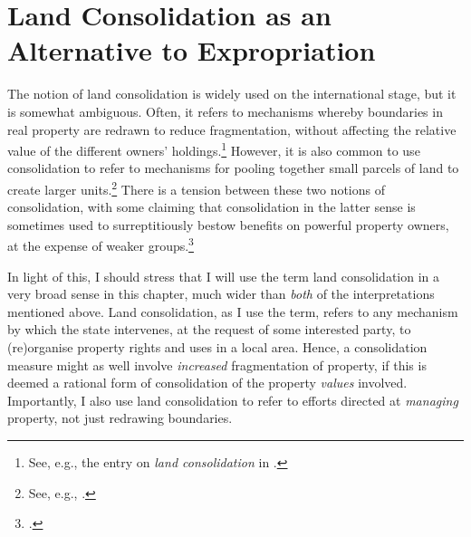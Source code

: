 \section{Land Consolidation as an Alternative to Expropriation}\label{sec:6:2}

The notion of land consolidation is widely used on the international stage, but it is somewhat ambiguous. Often, it refers to mechanisms whereby boundaries in real property are redrawn to reduce fragmentation, without affecting the relative value of the different owners' holdings.\footnote{See, e.g., the entry on {\it land consolidation} in \cite{mayhew09}.} However, it is also common to use consolidation to refer to mechanisms for pooling together small parcels of land to create larger units.\footnote{See, e.g., \cite{lerman06}.} There is a tension between these two notions of consolidation, with some claiming that consolidation in the latter sense is sometimes used to surreptitiously bestow benefits on powerful property owners, at the expense of weaker groups.\footcite[237-239]{lipton09}

In light of this, I should stress that I will use the term land consolidation in a very broad sense in this chapter, much wider than {\it both} of the interpretations mentioned above. Land consolidation, as I use the term, refers to any mechanism by which the state intervenes, at the request of some interested party, to (re)organise property rights and uses in a local area. Hence, a consolidation measure might as well involve {\it increased} fragmentation of property, if this is deemed a rational form of consolidation of the property {\it values} involved. Importantly, I also use land consolidation to refer to efforts directed at {\it managing} property, not just redrawing boundaries.


